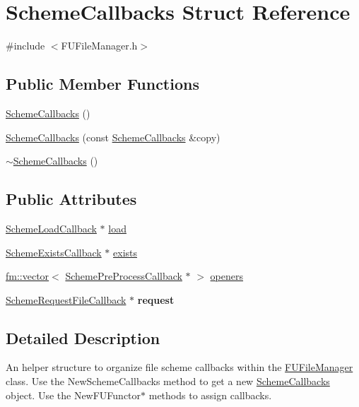 \hypertarget{structSchemeCallbacks}{
\section{SchemeCallbacks Struct Reference}
\label{structSchemeCallbacks}
}


{\ttfamily \#include $<$FUFileManager.h$>$}

\subsection*{Public Member Functions}
\begin{DoxyCompactItemize}
\item 
\hyperlink{structSchemeCallbacks_a8e9f849699d95b56dbde1f4d6b271c99}{SchemeCallbacks} ()
\item 
\hyperlink{structSchemeCallbacks_a46208c6716725d91bed6290494dc46bb}{SchemeCallbacks} (const \hyperlink{structSchemeCallbacks}{SchemeCallbacks} \&copy)
\item 
\hyperlink{structSchemeCallbacks_a47c17b3bc1014f2e70ef1e968658c9b5}{$\sim$SchemeCallbacks} ()
\end{DoxyCompactItemize}
\subsection*{Public Attributes}
\begin{DoxyCompactItemize}
\item 
\hyperlink{classIFunctor1}{SchemeLoadCallback} $\ast$ \hyperlink{structSchemeCallbacks_abb6b2030a834466fc6f3673916ad8f59}{load}
\item 
\hyperlink{classIFunctor1}{SchemeExistsCallback} $\ast$ \hyperlink{structSchemeCallbacks_a911c7c4e197a9fbe00364e1f0bf20200}{exists}
\item 
\hyperlink{classfm_1_1vector}{fm::vector}$<$ \hyperlink{classIFunctor2}{SchemePreProcessCallback} $\ast$ $>$ \hyperlink{structSchemeCallbacks_a8cb30bfc775cd2611484f995fdcff798}{openers}
\item 
\hypertarget{structSchemeCallbacks_a4bc471c34c3da29f43453d88106e6797}{
\hyperlink{classIFunctor3}{SchemeRequestFileCallback} $\ast$ {\bfseries request}}
\label{structSchemeCallbacks_a4bc471c34c3da29f43453d88106e6797}

\end{DoxyCompactItemize}


\subsection{Detailed Description}
An helper structure to organize file scheme callbacks within the \hyperlink{classFUFileManager}{FUFileManager} class. Use the NewSchemeCallbacks method to get a new \hyperlink{structSchemeCallbacks}{SchemeCallbacks} object. Use the NewFUFunctor$\ast$ methods to assign callbacks. 

